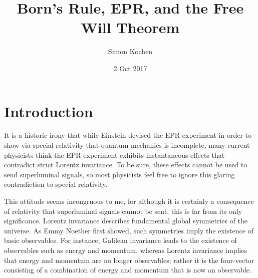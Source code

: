 \documentclass[12pt]{article}
\title{Born's Rule, EPR, and the Free Will Theorem}
\author{Simon Kochen}
\begin{document}
\date{2 Oct 2017}
   \maketitle
 
    \newcommand\cH{\mathcal{H}}
   \newcommand\cL{\mathcal{L}}
   \newcommand\rfl{\rotatebox{90}{$\rfloor$} }
   \newcommand\vp{\phi}
   \newcommand\tr{\mathop{\rm tr}\nolimits}
   \newcommand\Exp{\mathop{\rm Exp}\nolimits}
      \newcommand\Aut{\mathop{\rm Aut}\nolimits} 
   \newcommand\ssn[1]{\subsubsection*{#1}}
   \newcommand\R{\mathbb{R}}
   \newcommand\Ga{\Gamma}
   \newcommand\ga{\gamma}
      \newcommand\Q{\mathbb{Q}}
  \newcommand \lra[1]{\left\langle#1\right\rangle}
   \newcommand\la{\lambda}
   \newcommand\sig{\sigma}
   \newcommand\Om{\Omega}
   \newcommand\om{\omega}
    \newcommand\bpm{\begin{pmatrix}}
    \newcommand\epm{\end{pmatrix}}
   \newcommand\eps{\epsilon}
    \newcommand\bA{\mathbf{A}}
    \newcommand\bB{\mathbf{B}}
    \newcommand\ppsi{\psi} 
  \theoremstyle{definition}
\newtheorem*{defin}{Definition}


\section{Introduction}

It is a historic irony that while Einstein devised the EPR experiment in order to show via special relativity that quantum mechanics is incomplete, many current physicists think the EPR experiment exhibits instantaneous effects that contradict strict Lorentz invariance. To be sure, these effects cannot be used to send superluminal signals, so most physicists feel free to ignore this glaring contradiction to special relativity.

This attitude seems incongruous to me, for although it is certainly a consequence of relativity that superluminal signals cannot be sent, this is far from its only significance. Lorentz invariance describes fundamental global symmetries of the universe. As Emmy Noether first showed, such symmetries imply the existence of basic observables. For instance, Galilean invariance leads to the existence of observables such as energy and momentum, whereas Lorentz invariance implies that energy and momentum are no longer observables; rather it is the four-vector consisting of a combination of energy and momentum that is now an observable.
\end{document}
